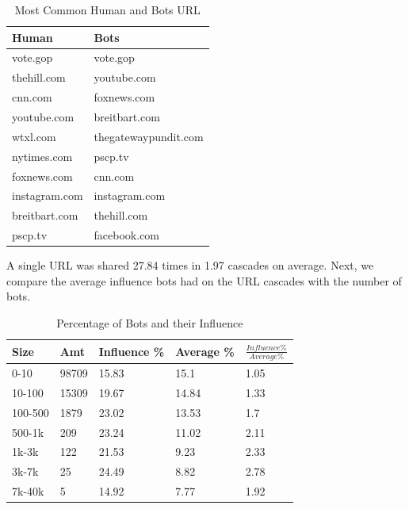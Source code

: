 \documentclass[letterpaper]{article}
\begin{document}
\begin{table}
    \centering
    \begin{tabular}{|l|l|}
    \hline
    \textbf{Human} & \textbf{Bots} \\ \hline
    vote.gop & vote.gop \\ \hline
    thehill.com & youtube.com \\ \hline
    cnn.com & foxnews.com \\ \hline
    youtube.com & breitbart.com \\ \hline
    wtxl.com & thegatewaypundit.com \\ \hline
    nytimes.com & pscp.tv \\ \hline
    foxnews.com & cnn.com \\ \hline
    instagram.com & instagram.com \\ \hline
    breitbart.com & thehill.com \\ \hline
    pscp.tv & facebook.com \\ \hline
    \end{tabular}
    \caption{Most Common Human and Bots URL}
    \label{tab:common_human_bots}
\end{table}

A single URL was shared 27.84 times in 1.97 cascades on average.
Next, we compare the average influence bots had on the URL cascades with the number of bots.

\begin{table}
    \centering
    \begin{tabular}{|l|l|l|l|l|}
    \hline
    Size & Amt & Influence \% & Average \% & \( \frac{Influence \%}{Average \%} \) \\ \hline
    0-10 & 98709 & 15.83 & 15.1 & 1.05 \\ \hline
    10-100 & 15309 & 19.67 & 14.84 & 1.33 \\ \hline
    100-500 & 1879 & 23.02 & 13.53 & 1.7 \\ \hline
    500-1k & 209 & 23.24 & 11.02 & 2.11 \\ \hline
    1k-3k & 122 & 21.53 & 9.23 & 2.33 \\ \hline
    3k-7k & 25 & 24.49 & 8.82 & 2.78 \\ \hline
    7k-40k & 5 & 14.92 & 7.77 & 1.92 \\ \hline
    \end{tabular}
    \caption{Percentage of Bots and their Influence}
    \label{tab:percentage_influence}
\end{table}
\end{document}
